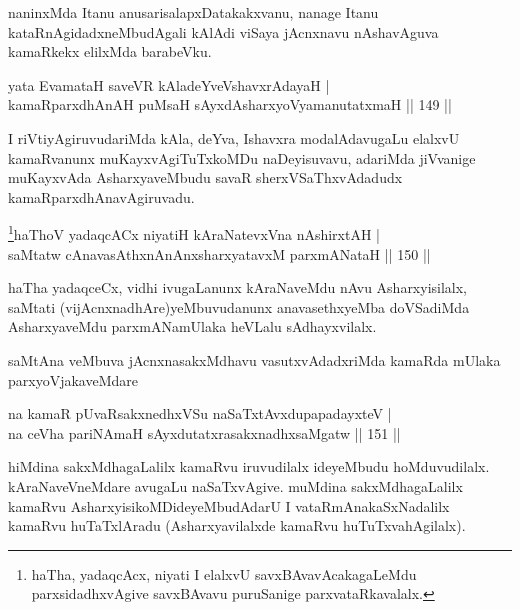 \begin{artha}
naninxMda Itanu anusarisalapxDatakakxvanu, nanage Itanu kataRnAgidadxneMbudAgali kAlAdi viSaya jAcnxnavu nAshavAguva kamaRkekx elilxMda barabeVku.
\end{artha}


\begin{shl}
yata EvamataH saveVR kAladeYveVshavxrAdayaH |\\
kamaRparxdhAnAH puMsaH sAyxdAsharxyoV\s yamanutatxmaH \hfill || 149 ||
\end{shl}

\begin{artha}
I riVtiyAgiruvudariMda kAla, deYva, Ishavxra modalAdavugaLu elalxvU kamaRvanunx muKayxvAgiTuTxkoMDu naDeyisuvavu, adariMda jiVvanige muKayxvAda AsharxyaveMbudu savaR sherxVSaThxvAdadudx kamaRparxdhAnavAgiruvadu.
\end{artha}

\begin{shl}
\footnote{haTha, yadaqcAcx, niyati I elalxvU savxBAvavAcakagaLeMdu parxsidadhxvAgive savxBAvavu puruSanige parxvataRkavalalx.}haThoV yadaqcACx niyatiH kAraNatevxVna nA\s \s shirxtAH |\\
saMtatw cAnavasAthxnAnAnx\s \s sharxyatavxM parxmANataH \hfill || 150 ||
\end{shl}

\begin{artha}
haTha yadaqceCx, vidhi ivugaLanunx kAraNaveMdu nAvu Asharxyisilalx, saMtati (vijAcnxnadhAre)yeMbuvudanunx anavasethxyeMba doVSadiMda AsharxyaveMdu parxmANamUlaka heVLalu sAdhayxvilalx.
\end{artha}


\begin{artha}
saMtAna veMbuva jAcnxnasakxMdhavu vasutxvAdadxriMda kamaRda mUlaka parxyoVjakaveMdare
\end{artha}

\begin{shl}
na kamaR pUvaRsakxnedhxVSu naSaTxtAvxdupapadayxteV |\\
na ceVha pariNAmaH sAyxdutatxrasakxnadhxsaMgatw \hfill || 151 ||
\end{shl}

\begin{artha}
hiMdina sakxMdhagaLalilx kamaRvu iruvudilalx ideyeMbudu hoMduvudilalx. kAraNaveVneMdare avugaLu naSaTxvAgive. muMdina sakxMdhagaLalilx kamaRvu AsharxyisikoMDideyeMbudAdarU I vataRmAnakaSxNadalilx kamaRvu huTaTxlAradu (Asharxyavilalxde kamaRvu huTuTxvahAgilalx).
\end{artha}

